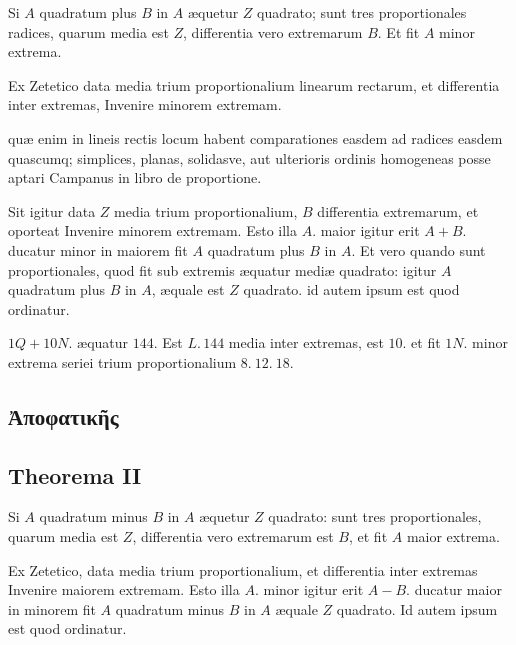 \documentclass[11pt,a4paper]{article}
\begin{document}
Si $A$ quadratum plus $B$ in $A$ æquetur $Z$ quadrato; sunt tres proportionales radices, quarum media est $Z$, differentia vero extremarum $B$. Et fit $A$ minor extrema.

Ex Zetetico  data media trium proportionalium linearum rectarum, et differentia inter extremas, Invenire minorem extremam.

quæ enim in lineis rectis locum habent comparationes easdem ad radices easdem quascumq; simplices, planas, solidasve, aut ulterioris ordinis homogeneas posse aptari  Campanus in libro de proportione.

Sit igitur data $Z$ media trium proportionalium, $B$ differentia extremarum, et oporteat Invenire minorem extremam. Esto illa $A$. maior igitur erit $A + B$. ducatur minor in maiorem fit $A$ quadratum plus $B$ in $A$. Et vero quando sunt proportionales, quod fit sub extremis æquatur mediæ quadrato: igitur $A$ quadratum plus $B$ in $A$, æquale est $Z$ quadrato. id autem ipsum est quod ordinatur.

$1Q + 10N.$ æquatur $144$. Est $L.\,144$ media inter extremas,  est $10$. et fit $1N.$ minor extrema seriei trium proportionalium $8.\ 12.\ 18.$

\subsection*{Ἀποφατικῆς}

\subsection*{Theorema II}

Si $A$ quadratum minus $B$ in $A$ æquetur $Z$ quadrato: sunt tres proportionales, quarum media est $Z$, differentia vero extremarum est $B$, et fit $A$ maior extrema.

Ex Zetetico, data media trium proportionalium, et differentia inter extremas Invenire maiorem extremam. Esto illa $A$. minor igitur erit $A - B$. ducatur maior in minorem fit $A$ quadratum minus $B$ in $A$ æquale $Z$ quadrato. Id autem ipsum est quod ordinatur.
\end{document}
